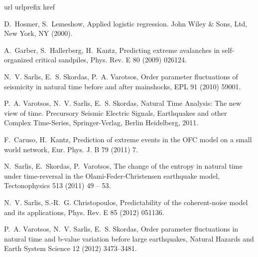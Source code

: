 \documentclass[preprint,12pt]{elsarticle}
\begin{document}







%
%
\begin{thebibliography}{10}
\expandafter\ifx\csname url\endcsname\relax
  \def\url#1{\texttt{#1}}\fi
\expandafter\ifx\csname urlprefix\endcsname\relax\def\urlprefix{URL }\fi
\expandafter\ifx\csname href\endcsname\relax
  \def\href#1#2{#2} \def\path#1{#1}\fi

D.~Hosmer, S.~Lemeshow, Applied logistic regression. John Wiley \& Sons, Ltd,
  New York, NY (2000).

A.~Garber, S.~Hallerberg, H.~Kantz, Predicting extreme avalanches in
  self-organized critical sandpiles, Phys. Rev. E 80 (2009) 026124.

N.~V. Sarlis, E.~S. Skordas, P.~A. Varotsos, {Order parameter fluctuations of
  seismicity in natural time before and after mainshocks}, EPL 91 (2010) 59001.

P.~A. Varotsos, N.~V. Sarlis, E.~S. Skordas, Natural Time Analysis: The new
  view of time. Precursory Seismic Electric Signals, Earthquakes and other
  Complex Time-Series, Springer-Verlag, Berlin Heidelberg, 2011.

F.~Caruso, H.~Kantz, {Prediction of extreme events in the OFC model on a small
  world network}, Eur. Phys. J. B 79 (2011) 7.

N.~Sarlis, E.~Skordas, P.~Varotsos, {The change of the entropy in natural time
  under time-reversal in the Olami-Feder-Christensen earthquake model},
  Tectonophysics 513 (2011) 49 -- 53.

N.~V. Sarlis, S.-R.~G. Christopoulos, Predictability of the coherent-noise
  model and its applications, Phys. Rev. E 85 (2012) 051136.

P.~A. Varotsos, N.~V. Sarlis, E.~S. Skordas, Order parameter fluctuations in
  natural time and b-value variation before large earthquakes, Natural Hazards
  and Earth System Science 12 (2012) 3473--3481.


\end{thebibliography}
\end{document}
